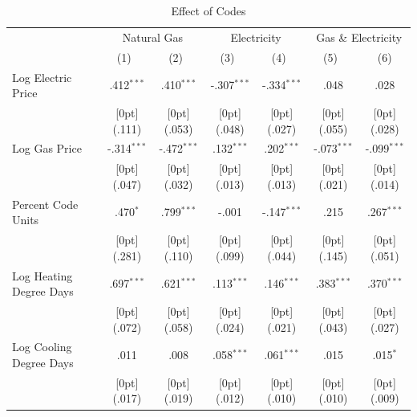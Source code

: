 \documentclass[10pt]{article}
\begin{document}
\begin{table}[h!]\footnotesize
\caption{Effect of Codes}
\label{main}
\begin{tabular*}{\textwidth}{@{\extracolsep{\fill}}lcccccc}	\toprule	
& \multicolumn{2}{c}{Natural Gas} &	\multicolumn{2}{c}{Electricity} &	\multicolumn{2}{c}{Gas \& Electricity} \\				
\cmidrule{2-7}						
	& \multicolumn{1}{c}{(1)\mbox{\ }} &	\multicolumn{1}{c}{(2)\mbox{\ }} &	\multicolumn{1}{c}{(3)\mbox{\ }} &	\multicolumn{1}{c}{(4)\mbox{\ }} &	\multicolumn{1}{c}{(5)\mbox{\ }} &	\multicolumn{1}{c}{(6)} \\
\midrule					
Log Electric Price &	.412$^{***}$ &	.410$^{***}$ &	-.307$^{***}$ &	-.334$^{***}$ &	.048 &	.028 \\
&	\raisebox{.7ex}[0pt]{\scriptsize (.111)} &	\raisebox{.7ex}[0pt]{\scriptsize (.053)} &	\raisebox{.7ex}[0pt]{\scriptsize (.048)} &	\raisebox{.7ex}[0pt]{\scriptsize (.027)} &	\raisebox{.7ex}[0pt]{\scriptsize (.055)} &	\raisebox{.7ex}[0pt]{\scriptsize (.028)} \\
Log Gas Price &	-.314$^{***}$ &	-.472$^{***}$ &	.132$^{***}$ &	.202$^{***}$ &	-.073$^{***}$ &	-.099$^{***}$ \\
&	\raisebox{.7ex}[0pt]{\scriptsize (.047)} &	\raisebox{.7ex}[0pt]{\scriptsize (.032)} &	\raisebox{.7ex}[0pt]{\scriptsize (.013)} &	\raisebox{.7ex}[0pt]{\scriptsize (.013)} &	\raisebox{.7ex}[0pt]{\scriptsize (.021)} &	\raisebox{.7ex}[0pt]{\scriptsize (.014)} \\
Percent Code Units &	.470$^{*}$ &	.799$^{***}$ &	-.001 &	-.147$^{***}$ &	.215 &	.267$^{***}$ \\
&	\raisebox{.7ex}[0pt]{\scriptsize (.281)} &	\raisebox{.7ex}[0pt]{\scriptsize (.110)} &	\raisebox{.7ex}[0pt]{\scriptsize (.099)} &	\raisebox{.7ex}[0pt]{\scriptsize (.044)} &	\raisebox{.7ex}[0pt]{\scriptsize (.145)} &	\raisebox{.7ex}[0pt]{\scriptsize (.051)} \\
Log Heating Degree Days &	.697$^{***}$ &	.621$^{***}$ &	.113$^{***}$ &	.146$^{***}$ &	.383$^{***}$ &	.370$^{***}$ \\
&	\raisebox{.7ex}[0pt]{\scriptsize (.072)} &	\raisebox{.7ex}[0pt]{\scriptsize (.058)} &	\raisebox{.7ex}[0pt]{\scriptsize (.024)} &	\raisebox{.7ex}[0pt]{\scriptsize (.021)} &	\raisebox{.7ex}[0pt]{\scriptsize (.043)} &	\raisebox{.7ex}[0pt]{\scriptsize (.027)} \\
Log Cooling Degree Days &	.011 &	.008 &	.058$^{***}$ &	.061$^{***}$ &	.015 &	.015$^{*}$ \\
&	\raisebox{.7ex}[0pt]{\scriptsize (.017)} &	\raisebox{.7ex}[0pt]{\scriptsize (.019)} &	\raisebox{.7ex}[0pt]{\scriptsize (.012)} &	\raisebox{.7ex}[0pt]{\scriptsize (.010)} &	\raisebox{.7ex}[0pt]{\scriptsize (.010)} &	\raisebox{.7ex}[0pt]{\scriptsize (.009)} \\

\end{tabular*}
\end{table}
\end{document}
